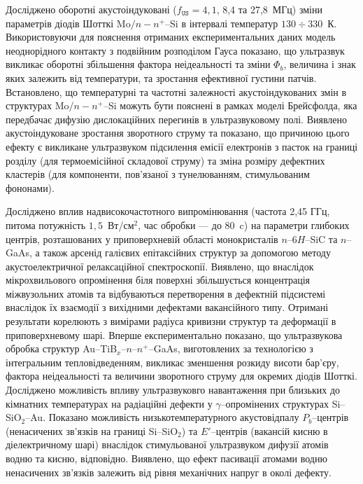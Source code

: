 Досліджено оборотні акустоіндуковані ($f_\mathtt{US}=4,1$, 8,4 та 27,8~МГц) зміни параметрів діодів Шотткі Mo$/n-n^+$--Si в інтервалі температур $130\div330$~К.
Використовуючи для пояснення отриманих експериментальних даних модель неоднорідного контакту з подвійним розподілом Гауса
показано, що ультразвук викликає оборотні збільшення фактора неідеальності та зміни $\Phi_{b}$,
величина і знак яких залежить від температури,
та зростання ефективної густини патчів.
Встановлено, що температурні та частотні залежності акустоіндукованих змін в структурах
 Mo$/n-n^+$--Si  можуть бути пояснені в рамках моделі Брейсфолда,
яка передбачає дифузію дислокаційних перегинів в ультразвуковому полі.
Виявлено акустоіндуковане зростання зворотного струму та показано, що причиною цього ефекту є викликане ультразвуком підсилення емісії електронів з пасток на границі розділу (для термоемісійної складової струму) та зміна розміру дефектних кластерів (для компоненти, пов'язаної з тунелюванням, стимульованим фононами).

 Досліджено вплив надвисокочастотного випромінювання (частота 2,45 ГГц, питома потужність  $1,5$~Вт/см$^2$, час обробки --- до 80~c) на параметри глибоких центрів, розташованих у приповерхневій області монокристалів $n$--6$H$--SiC та $n$--GaAs, а також арсенід галієвих епітаксійних структур за допомогою методу акустоелектричної релаксаційної спектроскопії.
Виявлено, що внаслідок мікрохвильового опромінення біля поверхні збільшується концентрація міжвузольних атомів та відбуваються перетворення в дефектній підсистемі внаслідок їх взаємодії з вихідними дефектами вакансійного типу.
Отримані результати корелюють з вимірами радіуса кривизни структур та деформації в приповерхневому шарі.
Вперше експериментально показано, що ультразвукова обробка структур
Au--TiB$_x$--$n$--$n^+$--GaAs, виготовлених
за технологією з інтегральним тепловідведенням, викликає зменшення розкиду висоти бар'єру, фактора неідеальності та величини зворотного струму для окремих діодів Шотткі.
Досліджено можливість впливу ультразвуковго навантаження при близьких до кімнатних температурах на радіаційні дефекти у $\gamma$--опромінених структурах Si--SiO$_2$--Au.
Показано можливість низькотемпературного акустовідпалу $P_b$--центрів (ненасичених зв'язків на границі Si--SiO$_2$)
та $E'$--центрів (вакансій кисню в діелектричному шарі) внаслідок стимульованої ультразвуком дифузії атомів водню та кисню, відповідно.
Виявлено, що ефект  пасивації атомами водню ненасичених зв'язків залежить
від рівня механічних напруг в околі дефекту.





\vspace{0.7cm}
\noindent
\keywords

\vspace{2cm}



